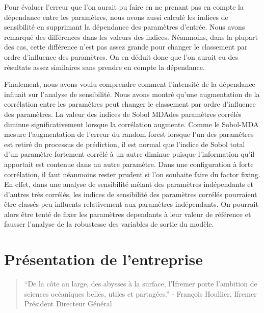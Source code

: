\documentclass[
]{article}
\begin{document}
Pour évaluer l'erreur que l'on aurait pu faire en ne prenant pas en
compte la dépendance entre les paramètres, nous avons aussi calculé les
indices de sensibilité en supprimant la dépendance des paramètres
d'entrée. Nous avons remarqué des différences dans les valeurs des
indices. Néanmoins, dans la plupart des cas, cette différence n'est pas
assez grande pour changer le classement par ordre d'influence des
paramètres. On en déduit donc que l'on aurait eu des résultats assez
similaires sans prendre en compte la dépendance.

Finalement, nous avons voulu comprendre comment l'intensité de la
dépendance influait sur l'analyse de sensibilité. Nous avons montré
qu'une augmentation de la corrélation entre les paramètres peut changer
le classement par ordre d'influence des paramètres. La valeur des
indices de Sobol MDAdes paramètres corrélés diminue significativement
lorsque la corrélation augmente. Comme le Sobol-MDA mesure
l'augmentation de l'erreur du random forest lorsque l'un des paramètres
est retiré du processus de prédiction, il est normal que l'indice de
Sobol total d'un paramètre fortement corrélé à un autre diminue puisque
l'information qu'il apportait est contenue dans un autre paramètre. Dans
une configuration à forte corrélation, il faut néanmoins rester prudent
si l'on souhaite faire du factor fixing. En effet, dans une analyse de
sensibilité mêlant des paramètres indépendants et d'autres très
corrélés, les indices de sensibilité des paramètres corrélés pourraient
être classés peu influents relativement aux paramètres indépendants. On
pourrait alors être tenté de fixer les paramètres dependants à leur
valeur de référence et fausser l'analyse de la robustesse des variables
de sortie du modèle.

\hypertarget{pruxe9sentation-de-lentreprise}{%
\section{Présentation de
l'entreprise}\label{pruxe9sentation-de-lentreprise}}

\begin{quote}
``De la côte au large, des abysses à la surface, l'Ifremer porte
l'ambition de sciences océaniques belles, utiles et partagées.'' -
François Houllier, Ifremer \textbar{} Président Directeur Général
\end{quote}
\end{document}
